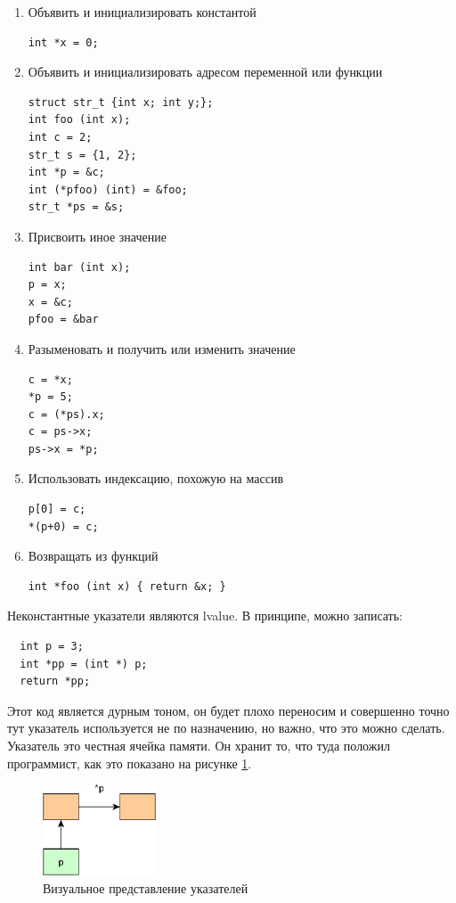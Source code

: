 \documentclass[a4paper,12pt,oneside]{book}
\begin{document}
\begin{enumerate}
\item Объявить и инициализировать константой
\begin{lstlisting}
int *x = 0;
\end{lstlisting}
\item Объявить и инициализировать адресом переменной или функции
\begin{lstlisting}
struct str_t {int x; int y;};
int foo (int x);
int c = 2;
str_t s = {1, 2};
int *p = &c;
int (*pfoo) (int) = &foo;
str_t *ps = &s;
\end{lstlisting}
\item Присвоить иное значение
\begin{lstlisting}
int bar (int x);
p = x;
x = &c;
pfoo = &bar
\end{lstlisting}
\item Разыменовать и получить или изменить значение
\begin{lstlisting}
c = *x;
*p = 5;
c = (*ps).x;
c = ps->x;
ps->x = *p;
\end{lstlisting}
\item Использовать индексацию, похожую на массив
\begin{lstlisting}
p[0] = c;
*(p+0) = c;
\end{lstlisting}
\item Возвращать из функций
\begin{lstlisting}
int *foo (int x) { return &x; }
\end{lstlisting}
\end{enumerate}

Неконстантные указатели являются lvalue. В принципе, можно записать:

\begin{lstlisting}
  int p = 3;
  int *pp = (int *) p;
  return *pp;
\end{lstlisting}

Этот код является дурным тоном, он будет плохо переносим и совершенно точно тут указатель используется не по назначению, но важно, что это можно сделать. Указатель это честная ячейка памяти. Он хранит то, что туда положил программист, как это показано на рисунке \ref{fig:pointers}.

\begin{figure}[h!]
\centering
\includegraphics[width=0.3\textwidth]{illustrations/pointers-crop.pdf}
\caption{Визуальное представление указателей}
\label{fig:pointers}
\end{figure}
\end{document}
